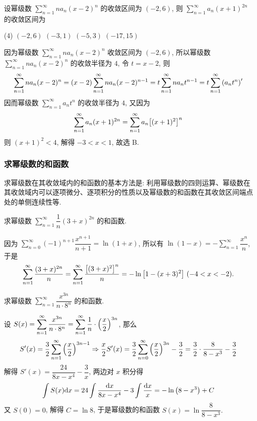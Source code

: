 \begin{example}[2020 数三]
    设幂级数 $\displaystyle\sum_{n=1}^{\infty}na_n(x-2)^n$ 的收敛区间为 $(-2,6)$, 则 $\displaystyle\sum_{n=1}^{\infty}a_n(x+1)^{2n}$ 的收敛区间为
    \begin{tasks}(4)
        \task $(-2,6)$
        \task $(-3,1)$
        \task $(-5,3)$
        \task $(-17,15)$
    \end{tasks}
\end{example}
\begin{solution}
    因为幂级数 $\displaystyle\sum_{n=1}^{\infty}na_n(x-2)^n$ 收敛区间为 $(-2,6)$, 所以幂级数 $\displaystyle\sum_{n=1}^{\infty}na_n(x-2)^n$ 的收敛半径为 $4$, 令 $t=x-2$, 则
    $$\sum_{n=1}^{\infty}na_n(x-2)^n=(x-2)\sum_{n=1}^{\infty}na_n(x-2)^{n-1}=t\sum_{n=1}^{\infty}na_nt^{n-1}=t\sum_{n=1}^{\infty}\qty(a_nt^n)'$$
    因而幂级数 $\displaystyle\sum_{n=1}^{\infty}a_nt^n$ 的收敛半径为 $4$, 又因为 $$\sum_{n=1}^{\infty}a_n(x+1)^{2n}=\sum_{n=1}^{\infty}a_n\qty[(x+1)^2]^n$$
    则 $(x+1)^2<4$, 解得 $-3<x<1$, 故选 B.
\end{solution}

\subsubsection{求幂级数的和函数}

求幂级数在其收敛域内的和函数的基本方法是: 利用幂级数的四则运算、幂级数在其收敛域内可以逐项微分、逐项积分的性质以及幂级数的和函数在其收敛区间端点处的单侧连续性等.

\begin{example}
    求幂级数 $\displaystyle\sum_{n=1}^{\infty}\dfrac{1}{n}(3+x)^{2n}$ 的和函数.
\end{example}
\begin{solution}
    因为 $\displaystyle \sum_{n=0}^{\infty}(-1)^{n+1}\dfrac{x^{n+1}}{n+1}=\ln(1+x)$, 所以有
    $\displaystyle\ln(1-x)=-\sum_{n=1}^{\infty}\dfrac{x^n}{n}$,
    于是 $$\displaystyle\sum_{n=1}^{\infty}\dfrac{(3+x)^{2n}}{n}=\sum_{n=1}^{\infty}\dfrac{\qty[(3+x)^{2}]^{n}}{n}=-\ln\qty[1-(x+3)^2]~ (-4<x<-2).$$
\end{solution}

\begin{example}
    求幂级数 $\displaystyle\sum_{n=1}^{\infty}\dfrac{x^{3n}}{n\cdot 8^n}$ 的和函数.
\end{example}
\begin{solution}
    设 $S(x)=\displaystyle\sum_{n=1}^{\infty}\dfrac{x^{3n}}{n\cdot 8^n}=\sum_{n=1}^{\infty}\dfrac{1}{n}\cdot\qty(\dfrac{x}{2})^{3n}$, 那么
    $$S'(x)=\dfrac{3}{2}\sum_{n=1}^{\infty}\qty(\dfrac{x}{2})^{3n-1}\Rightarrow \dfrac{x}{2}S'(x)=\dfrac{3}{2}\sum_{n=0}^{\infty}\qty(\dfrac{x}{2})^{3n}-\dfrac{3}{2}=\dfrac{3}{2}\cdot\dfrac{8}{8-x^3}-\dfrac{3}{2}$$
    解得 $S'(x)=\dfrac{24}{8x-x^4}-\dfrac{3}{x}$, 两边对 $x$ 积分得
    $$\int S(x)\dd x=24\int\dfrac{\dd x}{8x-x^4}-3\int\dfrac{\dd x}{x}=-\ln\qty(8-x^3)+C$$
    又 $S(0)=0$, 解得 $C=\ln8$, 于是幂级数的和函数 $S(x)=\ln\dfrac{8}{8-x^3}.$
\end{solution}

